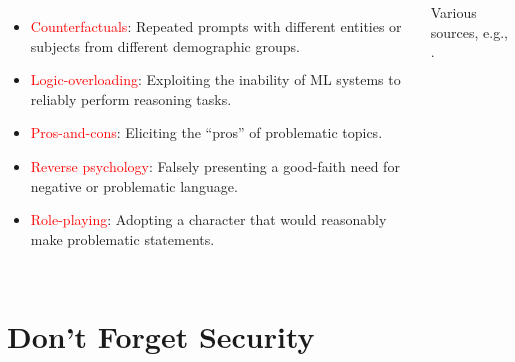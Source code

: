 \documentclass[11pt,
               aspectratio=169,
               hyperref={colorlinks}
               ]{beamer}
\begin{document}
\begin{frame}
\begin{columns}
				\begin{itemize}
					\item \small{\textcolor{red}{Counterfactuals}: Repeated prompts with different entities or subjects from different demographic groups.}
					\item \small{\textcolor{red}{Logic-overloading}: Exploiting the inability of ML systems to reliably perform reasoning tasks.}
					\item \small{\textcolor{red}{Pros-and-cons}: Eliciting the “pros” of problematic topics.}
					\item \small{\textcolor{red}{Reverse psychology}: Falsely presenting a good-faith need for negative or problematic language.}
					\item \small{\textcolor{red}{Role-playing}: Adopting a character that would reasonably make problematic statements.}
				\end{itemize}
				\vspace{10pt}
				\hspace{12pt}\small{Various sources, e.g., \cite{Adversa}.}
			
			\end{columns}
					
		\end{frame}


	\section{Don't Forget Security}
\end{document}
